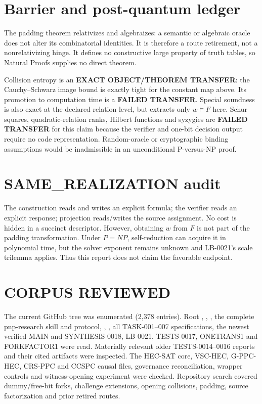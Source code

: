 \documentclass[11pt]{article}
\begin{document}
\section{Barrier and post-quantum ledger}

The padding theorem relativizes and algebraizes: a semantic or algebraic
oracle does not alter its combinatorial identities.  It is therefore a route
retirement, not a nonrelativizing hinge.  It defines no constructive large
property of truth tables, so Natural Proofs supplies no direct theorem.

Collision entropy is an \textbf{EXACT OBJECT/THEOREM TRANSFER}: the
Cauchy--Schwarz image bound is exactly tight for the constant map above.  Its
promotion to computation time is a \textbf{FAILED TRANSFER}.  Special
soundness is also exact at the declared relation level, but extracts only
$w\models F$ here.  Schur squares, quadratic-relation ranks, Hilbert functions
and syzygies are \textbf{FAILED TRANSFER} for this claim because the verifier
and one-bit decision output require no code representation.  Random-oracle or
cryptographic binding assumptions would be inadmissible in an unconditional
P-versus-NP proof.

\section{SAME\_REALIZATION audit}

The construction reads and writes an explicit formula; the verifier reads an
explicit response; projection reads/writes the source assignment.  No cost is
hidden in a succinct descriptor.  However, obtaining $w$ from $F$ is not part
of the padding transformation.  Under $P=NP$, self-reduction can acquire it in
polynomial time, but the solver exponent remains unknown and LB-0021's scale
trilemma applies.  Thus this report does not claim the favorable endpoint.

\section{CORPUS REVIEWED}

The current GitHub tree was enumerated (2,378 entries).  Root
, , , the complete pnp-research
skill and protocol, , , all TASK-001--007
specifications, the newest verified MAIN and SYNTHESIS-0018, LB-0021,
TESTS-0017, ONETRANS1 and FORKFACTOR1 were read.  Materially relevant older
TESTS-0014--0016 reports and their cited artifacts were inspected.  The
HEC-SAT core, VSC-HEC, G-PPC-HEC, CRS-PPC and CCSPC causal files, governance
reconciliation, wrapper controls and witness-opening experiment were checked.
Repository search covered dummy/free-bit forks, challenge extensions,
opening collisions, padding, source factorization and prior retired routes.
\end{document}
